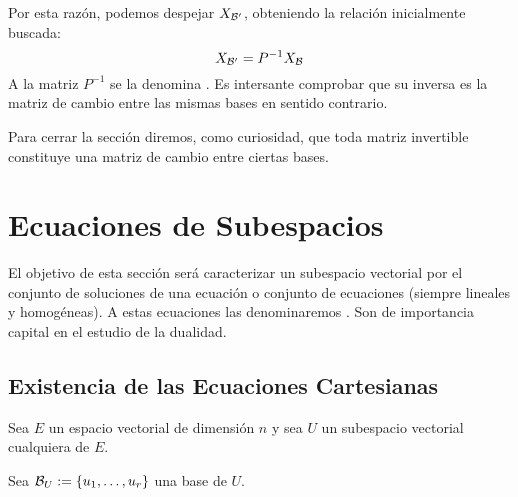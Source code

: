Por esta razón, podemos despejar $X_{\mathcal{B}'}$, obteniendo la relación inicialmente buscada:
\begin{equation}
	X_{\mathcal{B}'}=P^{-1}X_{\mathcal{B}}
\end{equation}
A la matriz $P^{-1}$ se la denomina . Es intersante comprobar que su inversa es la matriz de cambio entre las mismas bases en sentido contrario.

Para cerrar la sección diremos, como curiosidad, que toda matriz invertible constituye una matriz de cambio entre ciertas bases.

\section{Ecuaciones de Subespacios}
El objetivo de esta sección será caracterizar un subespacio vectorial por el conjunto de soluciones de una ecuación o conjunto de ecuaciones (siempre lineales y homogéneas). A estas ecuaciones las denominaremos . Son de importancia capital en el estudio de la dualidad.
\subsection{Existencia de las Ecuaciones Cartesianas}
Sea $E$ un espacio vectorial de dimensión $n$ y sea $U$ un subespacio vectorial cualquiera de $E$.

Sea $\mathcal{B}_U:=\{u_1,\dots,u_r\}$ una base de $U$.

